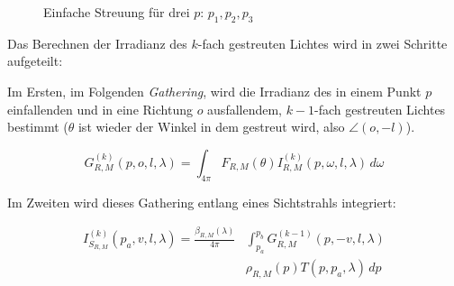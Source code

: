 \begin{figure}[h]
	\caption{Einfache Streuung für drei $p$: $p_1, p_2, p_3$}
	\label{SS-image}
\end{figure}

Das Berechnen der Irradianz des $k$-fach gestreuten Lichtes wird in zwei Schritte aufgeteilt:

Im Ersten, im Folgenden \emph{Gathering}, wird die Irradianz des in einem Punkt $p$ einfallenden und in eine Richtung $o$
ausfallendem, $k-1$-fach gestreuten Lichtes bestimmt ($\theta$ ist wieder der Winkel in dem gestreut wird, also
$\angle(o, -l)$).

\begin{equation} \label{eq:g}
	G^{(k)}_{R,M}(p,o,l,\lambda) = \int_{4\pi}^{} F_{R,M}(\theta)I^{(k)}_{R,M}(p,\omega,l,\lambda) \,d\omega
\end{equation}


Im Zweiten wird dieses Gathering entlang eines Sichtstrahls integriert:

\begin{equation} \label{eq:ms}
	\begin{aligned}
		I^{(k)}_{S_{R,M}}(p_a, v, l, \lambda) = \frac{\beta_{R,M}(\lambda)}{4\pi} &\int_{p_a}^{p_b}
		G^{(k-1)}_{R,M}(p,-v,l,\lambda)\\ &\rho_{R,M}(p) T(p, p_a, \lambda) \,dp
	\end{aligned}
\end{equation}

